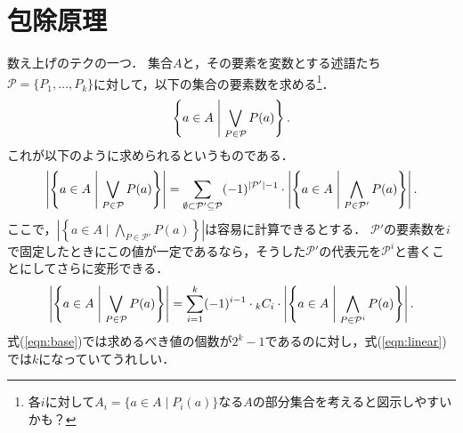 \documentclass{jsarticle}
\begin{document}
\section{包除原理}

数え上げのテクの一つ．
集合$A$と，その要素を変数とする述語たち$\mathcal{P}=\{P_1, \dots, P_k\}$に対して，以下の集合の要素数を求める\footnote{各$i$に対して$A_i=\{a\in A\mid P_i(a)\}$なる$A$の部分集合を考えると図示しやすいかも？}．
\[\left\{a\in A\Biggm| \bigvee_{P\in\mathcal{P}} P(a)\right\}.\]
これが以下のように求められるというものである．
\begin{align}\label{eqn:base}
\left|\left\{a\in A\Biggm| \bigvee_{P\in\mathcal{P}} P(a)\right\}\right|
= \sum_{\emptyset\subset\mathcal{P}'\subseteq\mathcal{P}} (-1)^{|\mathcal{P}'|-1}\cdot \left|\left\{a\in A\Biggm| \bigwedge_{P\in\mathcal{P}'} P(a)\right\}\right|.
\end{align}
ここで，$\left|\left\{a\in A\mid\bigwedge_{P\in\mathcal{P}'}P(a)\right\}\right|$は容易に計算できるとする．
%
$\mathcal{P}'$の要素数を$i$で固定したときにこの値が一定であるなら，そうした$\mathcal{P}'$の代表元を$\mathcal{P}^i$と書くことにしてさらに変形できる．
\begin{align}\label{eqn:linear}
\left|\left\{a\in A\Biggm| \bigvee_{P\in\mathcal{P}} P(a)\right\}\right|
= \sum_{i=1}^k (-1)^{i-1}\cdot{}_k C_i\cdot\left|\left\{a\in A\Biggm| \bigwedge_{P\in\mathcal{P}^i} P(a)\right\}\right|.
\end{align}
式(\ref{eqn:base})では求めるべき値の個数が$2^k-1$であるのに対し，式(\ref{eqn:linear})では$k$になっていてうれしい．
\end{document}
